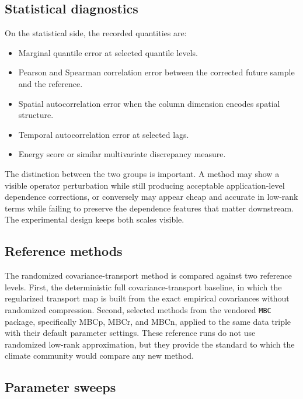\subsection{Statistical diagnostics}

On the statistical side, the recorded quantities are:
\begin{itemize}
	\item Marginal quantile error at selected quantile levels.
	\item Pearson and Spearman correlation error between the corrected future
	      sample and the reference.
	\item Spatial autocorrelation error when the column dimension encodes
	      spatial structure.
	\item Temporal autocorrelation error at selected lags.
	\item Energy score or similar multivariate discrepancy measure.
\end{itemize}
The distinction between the two groups is important. A method may show a visible
operator perturbation while still producing acceptable application-level
dependence corrections, or conversely may appear cheap and accurate in low-rank
terms while failing to preserve the dependence features that matter downstream.
The experimental design keeps both scales visible.

\subsection{Reference methods}

The randomized covariance-transport method is compared against two reference
levels. First, the deterministic full covariance-transport baseline, in which the
regularized transport map is built from the exact empirical covariances without
randomized compression. Second, selected methods from the vendored \texttt{MBC}
package, specifically MBCp, MBCr, and MBCn, applied to the same data triple with
their default parameter settings. These reference runs do not use randomized
low-rank approximation, but they provide the standard to which the climate
community would compare any new method.

\subsection{Parameter sweeps}

